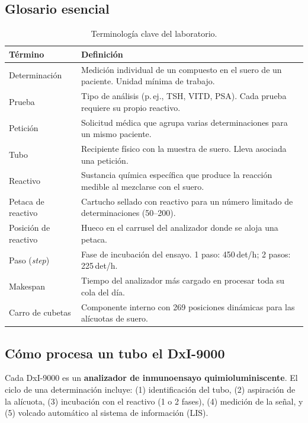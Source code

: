\documentclass[12pt, a4paper]{article}
\begin{document}
\subsection{Glosario esencial}

\begin{table}[H]
\centering
\caption{Terminología clave del laboratorio.}
\begin{tabularx}{\linewidth}{lX}
\toprule
\textbf{Término} & \textbf{Definición} \\
\midrule
Determinación & Medición individual de un compuesto en el suero de un paciente. Unidad mínima de trabajo. \\
Prueba & Tipo de análisis (p.\,ej., TSH, VITD, PSA). Cada prueba requiere su propio reactivo. \\
Petición & Solicitud médica que agrupa varias determinaciones para un mismo paciente. \\
Tubo & Recipiente físico con la muestra de suero. Lleva asociada una petición. \\
Reactivo & Sustancia química específica que produce la reacción medible al mezclarse con el suero. \\
Petaca de reactivo & Cartucho sellado con reactivo para un número limitado de determinaciones (50--200). \\
Posición de reactivo & Hueco en el carrusel del analizador donde se aloja una petaca. \\
Paso (\textit{step}) & Fase de incubación del ensayo. 1 paso: 450\,det/h; 2 pasos: 225\,det/h. \\
Makespan & Tiempo del analizador más cargado en procesar toda su cola del día. \\
Carro de cubetas & Componente interno con 269 posiciones dinámicas para las alícuotas de suero. \\
\bottomrule
\end{tabularx}
\end{table}

\subsection{Cómo procesa un tubo el DxI-9000}

Cada DxI-9000 es un \textbf{analizador de inmunoensayo quimioluminiscente}. El ciclo de
una determinación incluye: (1) identificación del tubo, (2) aspiración de la alícuota,
(3) incubación con el reactivo (1 o 2 fases), (4) medición de la señal, y (5) volcado
automático al sistema de información (LIS).
\end{document}
